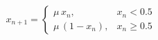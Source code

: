 \documentclass[preview,border=4pt]{standalone}
\begin{document}
\begin{equation}
x_{n+1} = \begin{cases}
\mu\, x_n, & x_n < 0.5 \\
\mu\, (1 - x_n), & x_n \geq 0.5
\end{cases}
\end{equation}
\end{document}
